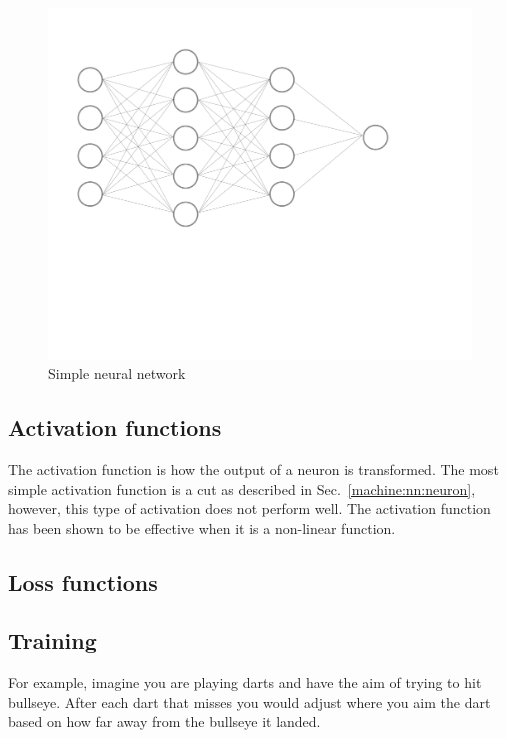 \begin{figure}[h]
    \centering
    \includegraphics[width=\columnwidth]{C3_cnn/simple_network.pdf}
    \caption{Simple neural network}
    \label{machine:nn:structure:plot}
\end{figure}


\subsection{\label{machine:nn:activation}Activation functions}

The activation function is how the output of a neuron is transformed. 
The most simple activation function is a cut as described in Sec.~\ref{machine:nn:neuron}, however, this type of activation does not perform well.
The activation function has been shown to be effective when it is a non-linear function. 



\subsection{\label{machine:nn:loss}Loss functions}


\subsection{\label{machine:nn:training}Training}

For example, imagine you are playing darts and have the aim of trying to hit bullseye.
After each dart that misses you would adjust where you aim the dart based on how far away from the bullseye it landed.

